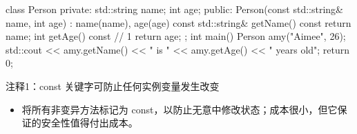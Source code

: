 
\begin{cpp}
class Person {
private:
  std::string name;
  int age;
public:
  Person(const std::string& name, int age) : name(name), age(age) {}
  const std::string& getName() const { return name; }
  int getAge() const { // 1
    return age;
  }
};
int main() {
  Person amy("Aimee", 26);
  std::cout << amy.getName() << " is " << amy.getAge() << " years old\n";
  return 0;
}
\end{cpp}

{\footnotesize
注释1：const 关键字可防止任何实例变量发生改变
}


\begin{itemize}
\item
将所有非变异方法标记为 const，以防止无意中修改状态；成本很小，但它保证的安全性值得付出成本。
\end{itemize}












